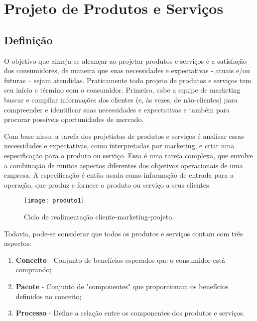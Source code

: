 \chapter[Projeto de Produtos e Serviços]{Projeto de Produtos e Serviços}
\label{chap:produtos}

	\section[Definição]{Definição}
	\label{sec:produtos_definicao}

		O objetivo que almeja-se alcançar ao projetar produtos e serviços é a satisfação dos consumidores, de maneira que suas necessidades e expectativas - atuais e/ou futuras – sejam atendidas. Praticamente todo projeto de produtos e serviços tem seu início e término com o consumidor. Primeiro, cabe a equipe de marketing buscar e compilar informações dos clientes (e, às vezes, de não-clientes) para compreender e identificar suas necessidades e expectativas e também para procurar possíveis oportunidades de mercado. 

		Com base nisso, a tarefa dos projetistas de produtos e serviços é analisar essas necessidades e expectativas, como interpretadas por marketing, e criar uma especificação para o produto ou serviço. Essa é uma tarefa complexa, que envolve a combinação de muitos aspectos diferentes dos objetivos operacionais de uma empresa. A especificação é então usada como informação de entrada para a operação, que produz e fornece o produto ou serviço a seus clientes. \cite{slack}

		\begin{figure}[h]
			\centering
			\texttt{[image: produto1]}
			\caption[Ciclo de realimentação cliente-marketing-projeto]{Ciclo de realimentação cliente-marketing-projeto.}
			\label{fig:produto1}
		\end{figure}

		Todavia, pode-se considerar que todos os produtos e serviços contam com três aspectos: 

		\begin{enumerate}
			\item{\textbf{Conceito} - Conjunto de benefícios esperados que o consumidor está comprando;}
			\item{\textbf{Pacote} - Conjunto de "componentes" que proporcionam os benefícios definidos no conceito;}
			\item{\textbf{Processo} - Define a relação entre os componentes dos produtos e serviços.}
		\end{enumerate}


